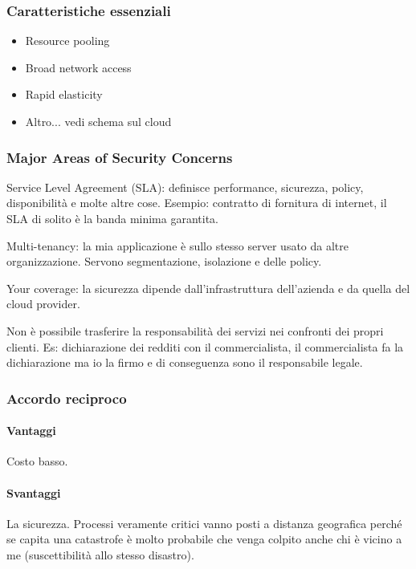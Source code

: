 \subsubsection{Caratteristiche essenziali}


\begin{itemize}
  \item Resource pooling
  \item Broad network access
  \item Rapid elasticity
  \item Altro... vedi schema sul cloud
\end{itemize}

\subsubsection{Major Areas of Security Concerns}

Service Level Agreement (SLA): definisce performance, sicurezza, policy, 
disponibilità e molte altre cose. Esempio: contratto di fornitura di internet, 
il SLA di solito è la banda minima garantita.

Multi-tenancy: la mia applicazione è sullo stesso server usato da altre 
organizzazione. Servono segmentazione, isolazione e delle policy.

Your coverage: la sicurezza dipende dall'infrastruttura dell'azienda e da 
quella del cloud provider.

Non è possibile trasferire la responsabilità dei servizi nei confronti dei 
propri clienti. Es: dichiarazione dei redditi con il commercialista, il 
commercialista fa la dichiarazione ma io la firmo e di conseguenza sono il 
responsabile legale.

\subsubsection{Accordo reciproco}

\paragraph*{Vantaggi} Costo basso. 

\paragraph*{Svantaggi}La sicurezza. Processi veramente critici vanno posti a 
distanza geografica perché se capita una catastrofe è molto probabile che venga 
colpito anche chi è vicino a me (suscettibilità allo stesso disastro).
